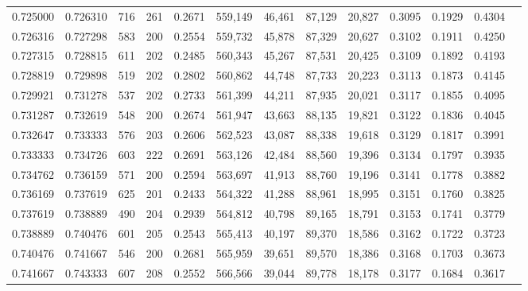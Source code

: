 \begin{tabular}{rrrrrrrrrrrrr}
0.725000 & 0.726310 &    716 &   261 &                                     0.2671 & 559,149 &  46,461 &  87,129 &  20,827 & 0.3095 & 0.1929 & 0.4304 \\
0.726316 & 0.727298 &    583 &   200 &                                     0.2554 & 559,732 &  45,878 &  87,329 &  20,627 & 0.3102 & 0.1911 & 0.4250 \\
0.727315 & 0.728815 &    611 &   202 &                                     0.2485 & 560,343 &  45,267 &  87,531 &  20,425 & 0.3109 & 0.1892 & 0.4193 \\
0.728819 & 0.729898 &    519 &   202 &                                     0.2802 & 560,862 &  44,748 &  87,733 &  20,223 & 0.3113 & 0.1873 & 0.4145 \\
0.729921 & 0.731278 &    537 &   202 &                                     0.2733 & 561,399 &  44,211 &  87,935 &  20,021 & 0.3117 & 0.1855 & 0.4095 \\
0.731287 & 0.732619 &    548 &   200 &                                     0.2674 & 561,947 &  43,663 &  88,135 &  19,821 & 0.3122 & 0.1836 & 0.4045 \\
0.732647 & 0.733333 &    576 &   203 &                                     0.2606 & 562,523 &  43,087 &  88,338 &  19,618 & 0.3129 & 0.1817 & 0.3991 \\
0.733333 & 0.734726 &    603 &   222 &                                     0.2691 & 563,126 &  42,484 &  88,560 &  19,396 & 0.3134 & 0.1797 & 0.3935 \\
0.734762 & 0.736159 &    571 &   200 &                                     0.2594 & 563,697 &  41,913 &  88,760 &  19,196 & 0.3141 & 0.1778 & 0.3882 \\
0.736169 & 0.737619 &    625 &   201 &                                     0.2433 & 564,322 &  41,288 &  88,961 &  18,995 & 0.3151 & 0.1760 & 0.3825 \\
0.737619 & 0.738889 &    490 &   204 &                                     0.2939 & 564,812 &  40,798 &  89,165 &  18,791 & 0.3153 & 0.1741 & 0.3779 \\
0.738889 & 0.740476 &    601 &   205 &                                     0.2543 & 565,413 &  40,197 &  89,370 &  18,586 & 0.3162 & 0.1722 & 0.3723 \\
0.740476 & 0.741667 &    546 &   200 &                                     0.2681 & 565,959 &  39,651 &  89,570 &  18,386 & 0.3168 & 0.1703 & 0.3673 \\
0.741667 & 0.743333 &    607 &   208 &                                     0.2552 & 566,566 &  39,044 &  89,778 &  18,178 & 0.3177 & 0.1684 & 0.3617 \\

\end{tabular}
